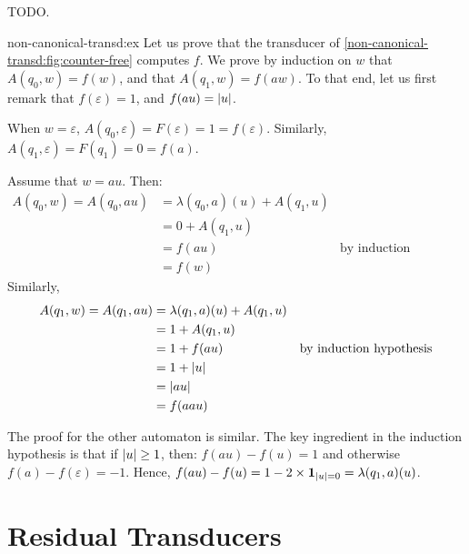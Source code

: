 \documentclass[11pt]{article}
\begin{document}
\begin{example}
    \label{non-canonical-transd:ex}
    TODO.
\end{example}
\begin{proofof}{non-canonical-transd:ex}
    Let us prove that the transducer of
    \cref{non-canonical-transd:fig:counter-free}
    computes $f$.
    We prove by induction on $w$
    that $A(q_0, w) = f(w)$,
    and that $A(q_1, w) = f(aw)$.
    To that end, let us first remark that $f(\varepsilon) = 1$,
    and $f(au) = \left| u \right|$.
    
    When $w = \varepsilon$, $A(q_0, \varepsilon) = F(\varepsilon) = 1 = f(\varepsilon)$.
    Similarly, $A(q_1, \varepsilon) = F(q_1) = 0 = f(a)$.

    Assume that $w = au$. Then:
    \begin{align*}
        A(q_0, w) = A(q_0, au) &= \lambda(q_0, a)(u) + A(q_1, u) \\ 
                               &= 0 + A(q_1,u) \\
                               &= f(au) & \text{by induction hypothesis} \\
                               &= f(w) 
    \end{align*}
    Similarly,
    \begin{align*}
        A(q_1, w) = A(q_1, au) &= \lambda(q_1, a)(u) + A(q_1, u) \\ 
                               &= 1 + A(q_1,u) \\
                               &= 1 + f(au) & \text{by induction hypothesis} \\
                               &= 1 + \left| u \right| \\
                               &= \left| au \right| \\
                               &= f(aau) \\
    \end{align*}

    The proof for the other automaton is similar. The
    key ingredient in the induction hypothesis is that if $\left| u \right| \geq 1$, then:
    $f(au) - f(u) = 1$ and otherwise $f(a) - f(\varepsilon) = -1$.
    Hence, $f(au) - f(u) = 1 - 2 \times \mathbf{1}_{\left| u \right| = 0} = \lambda(q_1, a)(u)$.
\end{proofof}

\section{Residual Transducers}
\label{residual-transducer:sec}
\end{document}
